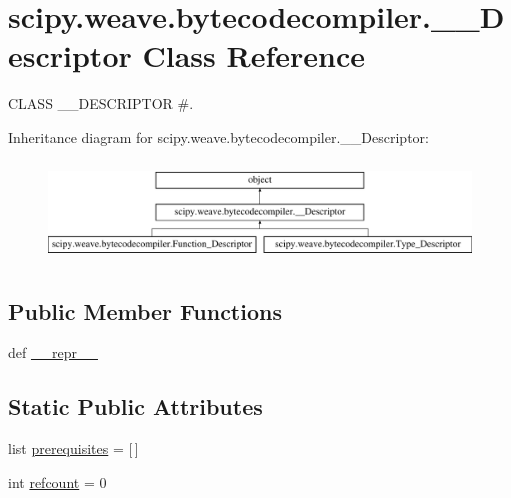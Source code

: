 \hypertarget{classscipy_1_1weave_1_1bytecodecompiler_1_1____Descriptor}{}\section{scipy.\+weave.\+bytecodecompiler.\+\_\+\+\_\+\+Descriptor Class Reference}
\label{classscipy_1_1weave_1_1bytecodecompiler_1_1____Descriptor}


C\+L\+A\+S\+S \+\_\+\+\_\+\+D\+E\+S\+C\+R\+I\+P\+T\+O\+R \#.  


Inheritance diagram for scipy.\+weave.\+bytecodecompiler.\+\_\+\+\_\+\+Descriptor\+:\begin{figure}[H]
\begin{center}
\leavevmode
\includegraphics[height=2.675159cm]{classscipy_1_1weave_1_1bytecodecompiler_1_1____Descriptor}
\end{center}
\end{figure}
\subsection*{Public Member Functions}
\begin{DoxyCompactItemize}
\item 
def \hyperlink{classscipy_1_1weave_1_1bytecodecompiler_1_1____Descriptor_a8722080818d440b1c07a40b2f61a96a7}{\+\_\+\+\_\+repr\+\_\+\+\_\+}
\end{DoxyCompactItemize}
\subsection*{Static Public Attributes}
\begin{DoxyCompactItemize}
\item 
list \hyperlink{classscipy_1_1weave_1_1bytecodecompiler_1_1____Descriptor_a3c386f72c84abd596be10bf83fb4a55f}{prerequisites} = \mbox{[}$\,$\mbox{]}
\item 
int \hyperlink{classscipy_1_1weave_1_1bytecodecompiler_1_1____Descriptor_acabdb8436f2be6e2b3e2216a126818c2}{refcount} = 0
\end{DoxyCompactItemize}


